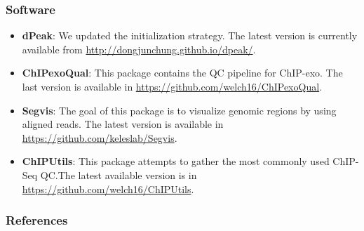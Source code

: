 \documentclass[table,xcolor=dvipsnames]{beamer}\usepackage[]{graphicx}\usepackage[]{color}
\begin{document}
\begin{frame}[t]
\frametitle{Software}  
\begin{itemize}
\item \textbf{dPeak}: We updated the initialization strategy. The
  latest version is currently available from
  \url{http://dongjunchung.github.io/dpeak/}.
\item \textbf{ChIPexoQual}: This package contains the QC pipeline for
  ChIP-exo. The last version is available in
  \url{https://github.com/welch16/ChIPexoQual}.
\item \textbf{Segvis}: The goal of this package is to visualize
  genomic regions by using aligned reads. The latest version is
  available in \url{https://github.com/keleslab/Segvis}.
\item \textbf{ChIPUtils}: This package attempts to gather the most
  commonly used ChIP-Seq QC.The latest available version is in
  \url{https://github.com/welch16/ChIPUtils}.
\end{itemize}

\end{frame}

\begin{frame}
  \frametitle{References}

{\tiny

\nocite{exo1}
\nocite{dpeak}



}

\end{frame}
\end{document}

